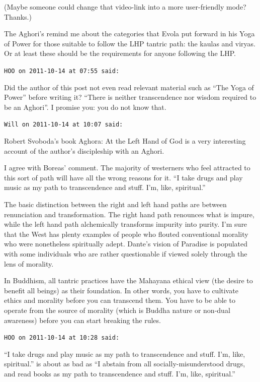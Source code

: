 \begin{footnotesize}
\begin{sffamily}
(Maybe someone could change that video-link into a more user-friendly mode? Thanks.)

The Aghori's remind me about the categories that Evola put forward in his Yoga of Power for those suitable to follow the LHP tantric path: the kaulas and viryas. Or at least these should be the requirements for anyone following the LHP.

\hfill

\texttt{HOO on 2011-10-14 at 07:55 said:}

Did the author of this post not even read relevant material such as ``The Yoga of Power'' before writing it? ``There is neither transcendence nor wisdom required to be an Aghori''. I promise you: you do not know that.

\hfill

\texttt{Will on 2011-10-14 at 10:07 said:}

Robert Svoboda's book Aghora: At the Left Hand of God is a very interesting account of the author's discipleship with an Aghori.

I agree with Boreas' comment. The majority of westerners who feel attracted to this sort of path will have all the wrong reasons for it. ``I take drugs and play music as my path to transcendence and stuff. I'm, like, spiritual.''

The basic distinction between the right and left hand paths are between renunciation and transformation. The right hand path renounces what is impure, while the left hand path alchemically transforms impurity into purity. I'm sure that the West has plenty examples of people who flouted conventional morality who were nonetheless spiritually adept. Dante's vision of Paradise is populated with some individuals who are rather questionable if viewed solely through the lens of morality.

In Buddhism, all tantric practices have the Mahayana ethical view (the desire to benefit all beings) as their foundation. In other words, you have to cultivate ethics and morality before you can transcend them. You have to be able to operate from the source of morality (which is Buddha nature or non-dual awareness) before you can start breaking the rules.

\hfill

\texttt{HOO on 2011-10-14 at 10:28 said:}

``I take drugs and play music as my path to transcendence and stuff. I'm, like, spiritual.'' is about as bad as ``I abstain from all socially-misunderstood drugs, and read books as my path to transcendence and stuff. I'm, like, spiritual.''


\end{sffamily}
\end{footnotesize}
